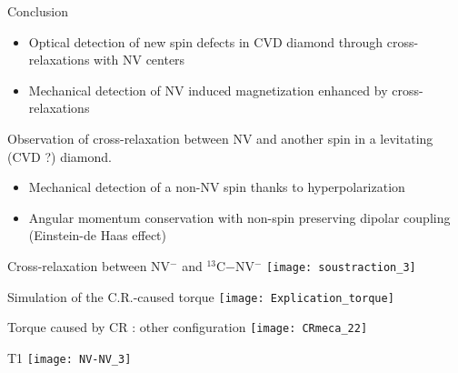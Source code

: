 \documentclass{beamer}
\begin{document}
\begin{frame}{Conclusion}
\begin{tcolorbox}[title=Summary,colbacktitle=red!80!white]
\begin{itemize}
\item{Optical detection of new spin defects in CVD diamond through cross-relaxations with NV centers}
\item{Mechanical detection of NV induced magnetization enhanced by cross-relaxations}
\end{itemize}
\end{tcolorbox}
\pause
\begin{tcolorbox}[title=Prospects,colbacktitle=blue!80!white]
Observation of cross-relaxation between NV and another spin in a levitating (CVD ?) diamond.
\begin{itemize}
\item Mechanical detection of a non-NV spin thanks to hyperpolarization
\item Angular momentum conservation with non-spin preserving dipolar coupling (Einstein-de Haas effect)
\end{itemize}
\end{tcolorbox}
\end{frame}
\begin{frame}{Cross-relaxation between NV$^-$ and $^{13}$C$-$NV$^-$}
\texttt{[image: soustraction\_3]}
\end{frame}
\begin{frame}{Simulation of the C.R.-caused torque}
\centering
\texttt{[image: Explication\_torque]}
\end{frame}
\begin{frame}{Torque caused by CR : other configuration}
\centering
\texttt{[image: CRmeca\_22]}
\end{frame}
\begin{frame}{T1}
\centering
\texttt{[image: NV-NV\_3]}
\end{frame}
\end{document}
